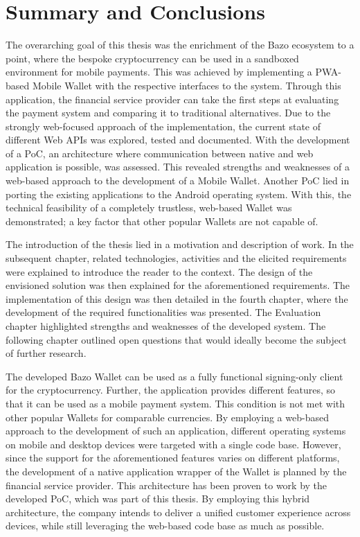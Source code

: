 \chapter{Summary and Conclusions}

The overarching goal of this thesis was the enrichment of the Bazo ecosystem to a point, where the bespoke cryptocurrency can be used in a sandboxed environment for mobile payments. This was achieved by implementing a PWA-based Mobile Wallet with the respective interfaces to the system. Through this application, the financial service provider can take the first steps at evaluating the payment system and comparing it to traditional alternatives. Due to the strongly web-focused approach of the implementation, the current state of different Web APIs was explored, tested and documented. With the development of a PoC, an architecture where communication between native and web application is possible, was assessed. This revealed strengths and weaknesses of a web-based approach to the development of a Mobile Wallet. Another PoC lied in porting the existing applications to the Android operating system. With this, the technical feasibility of a completely trustless, web-based Wallet was demonstrated; a key factor that other popular Wallets are not capable of.

The introduction of the thesis lied in a motivation and description of work. In the subsequent chapter, related technologies, activities and the elicited requirements were explained to introduce the reader to the context. The design of the envisioned solution was then explained for the aforementioned requirements. The implementation of this design was then detailed in the fourth chapter, where the development of the required functionalities was presented. The Evaluation chapter highlighted strengths and weaknesses of the developed system. The following chapter outlined open questions that would ideally become the subject of further research.

The developed Bazo Wallet can be used as a fully functional signing-only client for the cryptocurrency. Further, the application provides different features, so that it can be used as a mobile payment system. This condition is not met with other popular Wallets for comparable currencies. By employing a web-based approach to the development of such an application, different operating systems on mobile and desktop devices were targeted with a single code base. However, since the support for the aforementioned features varies on different platforms, the development of a native application wrapper of the Wallet is planned by the financial service provider. This architecture has been proven to work by the developed PoC, which was part of this thesis. By employing this hybrid architecture, the company intends to deliver a unified customer experience across devices, while still leveraging the web-based code base as much as possible.